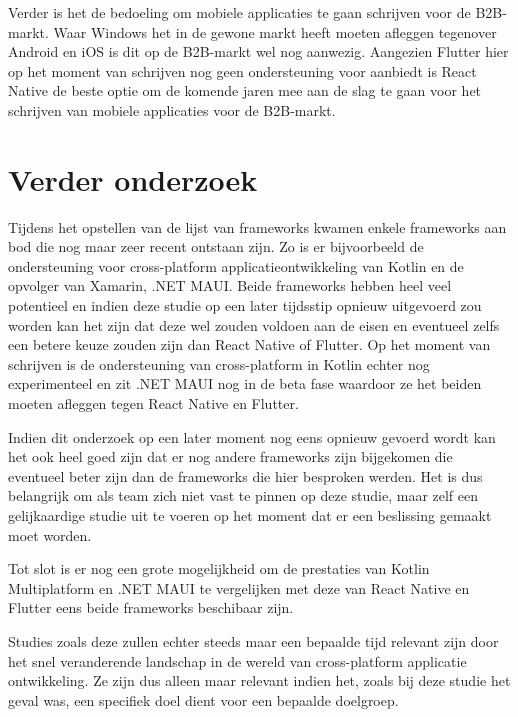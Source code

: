 Verder is het de bedoeling om mobiele applicaties te gaan schrijven voor de B2B-markt. Waar Windows het in de gewone markt heeft moeten afleggen tegenover Android en iOS is dit op de B2B-markt wel nog aanwezig. Aangezien Flutter hier op het moment van schrijven nog geen ondersteuning voor aanbiedt is React Native de beste optie om de komende jaren mee aan de slag te gaan voor het schrijven van mobiele applicaties voor de B2B-markt.

\section{Verder onderzoek}
\label{sec:verderOnderzoek}

Tijdens het opstellen van de lijst van frameworks kwamen enkele frameworks aan bod die nog maar zeer recent ontstaan zijn. Zo is er bijvoorbeeld de ondersteuning voor cross-platform applicatieontwikkeling van Kotlin en de opvolger van Xamarin, .NET MAUI. Beide frameworks hebben heel veel potentieel en indien deze studie op een later tijdsstip opnieuw uitgevoerd zou worden kan het zijn dat deze wel zouden voldoen aan de eisen en eventueel zelfs een betere keuze zouden zijn dan React Native of Flutter. Op het moment van schrijven is de ondersteuning van cross-platform in Kotlin echter nog experimenteel en zit .NET MAUI nog in de beta fase waardoor ze het beiden moeten afleggen tegen React Native en Flutter.

Indien dit onderzoek op een later moment nog eens opnieuw gevoerd wordt kan het ook heel goed zijn dat er nog andere frameworks zijn bijgekomen die eventueel beter zijn dan de frameworks die hier besproken werden. Het is dus belangrijk om als team zich niet vast te pinnen op deze studie, maar zelf een gelijkaardige studie uit te voeren op het moment dat er een beslissing gemaakt moet worden.

Tot slot is er nog een grote mogelijkheid om de prestaties van Kotlin Multiplatform en .NET MAUI te vergelijken met deze van React Native en Flutter eens beide frameworks beschibaar zijn. 

Studies zoals deze zullen echter steeds maar een bepaalde tijd relevant zijn door het snel veranderende landschap in de wereld van cross-platform applicatie ontwikkeling. Ze zijn dus alleen maar relevant indien het, zoals bij deze studie het geval was, een specifiek doel dient voor een bepaalde doelgroep.






